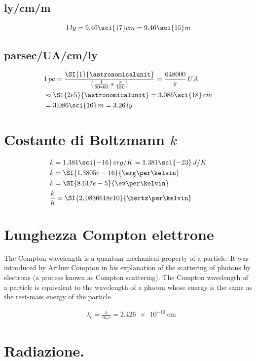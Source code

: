 \subsection{ly/cm/m}

\begin{equation*}
1\,ly=9.46\sci{17}cm=9.46\sci{15}m
\end{equation*}

\subsection{parsec/UA/cm/ly}

\begin{align*}
&1\,pc=\frac{\SI{1}{\astronomicalunit}}{(\frac{1}{60*60}*\frac{\pi}{180})}=\frac{648000}{\pi}\,UA\\
&\approx\SI{2e5}{\astronomicalunit}=3.086\sci{18}\,cm\\
&=3.086\sci{16}\,m=3.26\,ly
\end{align*}

\section{Costante di Boltzmann $k$}


\begin{align*}
&k=1.381\sci{-16}\,erg/K=1.381\sci{-23}\,J/K\\
&k=\SI{1.3805e-16}{\erg\per\kelvin}\\
&k=\SI{8.617e-5}{\ev\per\kelvin}\\
&\frac{k}{h}=\SI{2,0836618e10}{\hertz\per\kelvin}
\end{align*}

\section{Lunghezza Compton elettrone}

The Compton wavelength is a quantum mechanical property of a particle. It was introduced by Arthur Compton in his explanation of the scattering of photons by electrons (a process known as Compton scattering). The Compton wavelength of a particle is equivalent to the wavelength of a photon whose energy is the same as the rest-mass energy of the particle.

\begin{align*}
&\lambda_c=\frac{h}{m_ec}=\SI{2.426e-10}{\cm}
\end{align*}


\section{Radiazione.}

